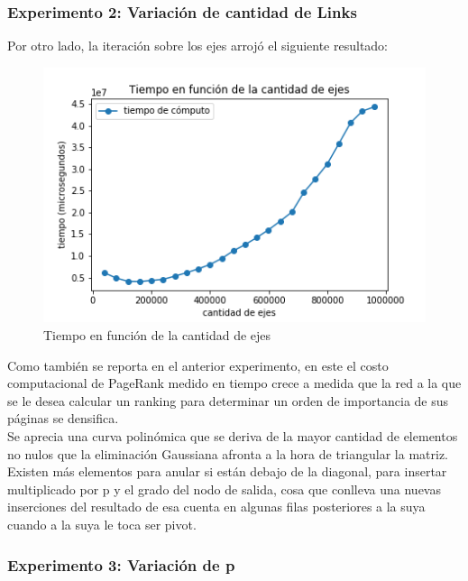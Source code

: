 \subsubsection{Experimento 2: Variación de cantidad de Links}

Por otro lado, la iteración sobre los ejes arrojó el siguiente resultado:

\begin{figure}[H]
   \begin{center}
     \includegraphics{img/tiempo_ejes_solo.png} 
  \end{center}
\caption{Tiempo en función de la cantidad de ejes} \label{fig:exp1-ejes}
\end{figure}

Como también se reporta en el anterior experimento, en este el costo computacional de PageRank medido en tiempo crece a medida que la red a la que se le desea calcular un ranking para determinar un orden de importancia de sus páginas se densifica. \\

Se aprecia una curva polinómica que se deriva de la mayor cantidad de elementos no nulos que la eliminación Gaussiana afronta a la hora de triangular la matriz. Existen más elementos para anular si están debajo de la diagonal, para insertar multiplicado por p y el grado del nodo de salida, cosa que conlleva una nuevas inserciones del resultado de esa cuenta en algunas filas posteriores a la suya cuando a la suya le toca ser pivot. \\
 
\newpage

\subsubsection{Experimento 3: Variación de p}



